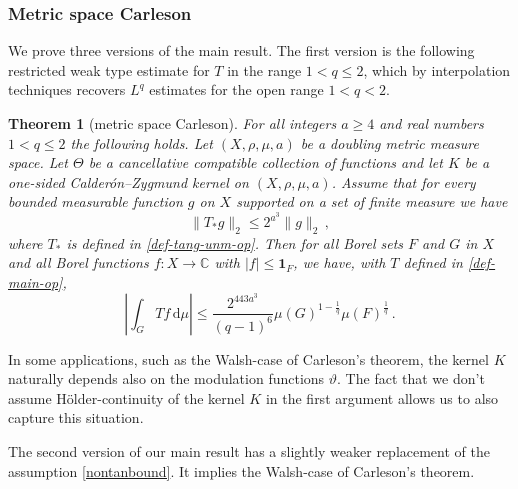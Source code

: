 \documentclass[12pt]{amsart}
\theoremstyle{definition}
\theoremstyle{plain}
\newtheorem{theorem}{Theorem}[subsection]
\def\C{\mathbb{C}}
\newcommand{\mfa}{{\vartheta}}
\newcommand{\Mf}{{\Theta}}
\begin{document}
\subsubsection{Metric space Carleson}\label{subsubsec:metric-carleson}

We prove three versions of the main result.
The first version is the following restricted weak type estimate for $T$ in the range $1<q\le 2$,
which by interpolation techniques recovers $L^q$ estimates for the open range $1<q<2$.
\begin{theorem}[metric space Carleson]
\label{metric-space-Carleson}
    For all integers $a \ge 4$ and real numbers $1<q\le 2$ the following holds.
    Let $(X,\rho,\mu,a)$ be a doubling metric measure space.
    Let $\Mf$ be a cancellative compatible collection of functions and let $K$ be a one-sided Calder\'on--Zygmund kernel on $(X,\rho,\mu,a)$.
    Assume that for every bounded measurable function $g$ on $X$ supported on a set of finite measure we have
    \begin{equation}\label{nontanbound}
        \|T_{*}g\|_{2} \leq 2^{a^3} \|g\|_2\,,
    \end{equation}
    where $T_{*}$ is defined in \eqref{def-tang-unm-op}.
    Then for all Borel sets $F$ and $G$ in $X$ and all Borel functions $f:X\to \C$ with
    $|f|\le \mathbf{1}_F$, we have, with $T$ defined in \eqref{def-main-op},
    \begin{equation}
        \label{resweak}
        \left|\int_{G} T f \, \mathrm{d}\mu\right| \leq \frac{2^{443a^3}}{(q-1)^6} \mu(G)^{1-\frac{1}{q}} \mu(F)^{\frac{1}{q}}\, .
    \end{equation}
\end{theorem}

In some applications, such as the Walsh-case of Carleson's theorem, the kernel $K$ naturally depends also on the modulation functions $\mfa$.
The fact that we don't assume H\"older-continuity of the kernel $K$ in the first argument allows us to also capture this situation.

The second version of our main result has a slightly weaker replacement of the assumption \eqref{nontanbound}.
It implies the Walsh-case of Carleson's theorem.
\end{document}
